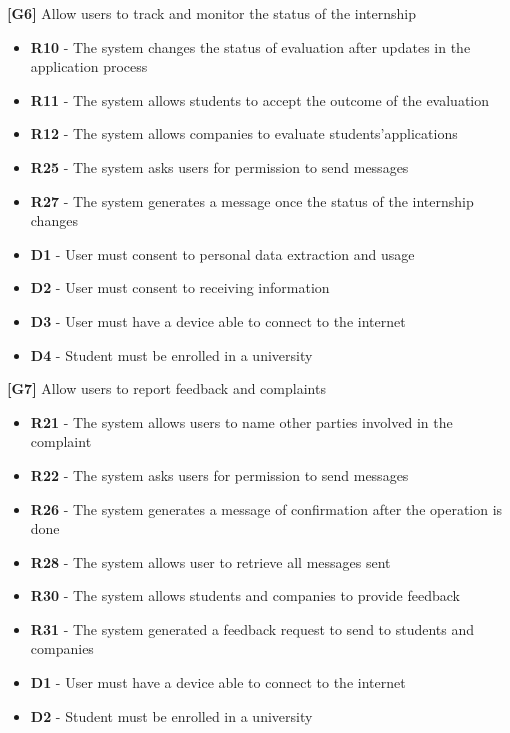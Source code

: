 \textbf{[G6]} Allow users to track and monitor the status of the internship
\begin{itemize}
    \item \textbf{R10} - The system changes the status of evaluation after updates in the application process
    \item \textbf{R11} - The system allows students to accept the outcome of the evaluation
    \item \textbf{R12} - The system allows companies to evaluate students’applications
    \item \textbf{R25} - The system asks users for permission to send messages
    \item \textbf{R27} - The system generates a message once the status of the internship changes
    \item \textbf{D1} - User must consent to personal data extraction and usage
    \item \textbf{D2} - User must consent to receiving information
    \item \textbf{D3} - User must have a device able to connect to the internet
    \item \textbf{D4} - Student must be enrolled in a university
\end{itemize}

\textbf{[G7]} Allow users to report feedback and complaints
\begin{itemize}
    \item \textbf{R21} - The system allows users to name other parties involved in the complaint
    \item \textbf{R22} - The system asks users for permission to send messages
    \item \textbf{R26} - The system generates a message of confirmation after the operation is done
    \item \textbf{R28} - The system allows user to retrieve all messages sent 
    \item \textbf{R30} - The system allows students and companies to provide feedback
    \item \textbf{R31} - The system generated a feedback request to send to students and companies
    \item \textbf{D1} - User must have a device able to connect to the internet
    \item \textbf{D2} - Student must be enrolled in a university
\end{itemize}

